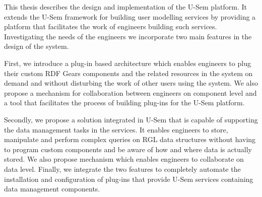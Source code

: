 This thesis describes the design and implementation of the U-Sem platform. It extends the U-Sem framework for building user modelling services by providing a platform that facilitates the work of engineers building such services. Investigating the needs of the engineers we incorporate two main features in the design of the system.

First, we introduce a plug-in based architecture which enables engineers to plug their custom RDF Gears components and the related resources in the system on demand and without disturbing the work of other users using the system. We also propose a mechanism for collaboration between engineers on component level and a tool that facilitates the process of building plug-ins for the U-Sem platform. 

Secondly, we propose a solution integrated in U-Sem that is capable of supporting the data management tasks in the services. It enables engineers to store, manipulate and perform complex queries on RGL data structures without having to program custom components and be aware of how and where data is actually stored. We also propose mechanism which enables engineers to collaborate on data level. Finally, we integrate the two features to completely automate the installation and configuration of plug-ins that provide U-Sem services containing data management components.